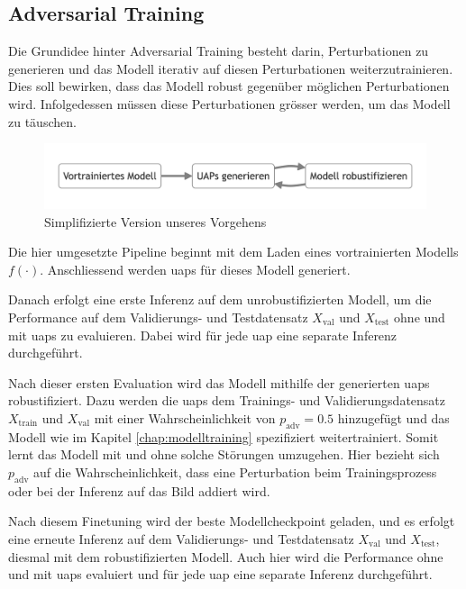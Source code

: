 \subsection{Adversarial Training} \label{chap:adversarial training}

Die Grundidee hinter Adversarial Training besteht darin, Perturbationen zu generieren und das Modell iterativ auf diesen Perturbationen weiterzutrainieren. Dies soll bewirken, dass das Modell robust gegenüber möglichen Perturbationen wird. Infolgedessen müssen diese Perturbationen grösser werden, um das Modell zu täuschen.

\begin{figure}[H]
    \centering
    \includegraphics[width=\linewidth]{01-images/04-methodik/simplified_overview.png}
    \caption{Simplifizierte Version unseres Vorgehens}
    \label{fig:07-simplified_overview}
\end{figure}

Die hier umgesetzte Pipeline beginnt mit dem Laden eines vortrainierten Modells $f(\cdot)$. Anschliessend werden \acrshort{uap}s für dieses Modell generiert. 

Danach erfolgt eine erste Inferenz auf dem unrobustifizierten Modell, um die Performance auf dem Validierungs- und  Testdatensatz $X_{\text{val}}$ und $X_{\text{test}}$ ohne und mit \acrshort{uap}s zu evaluieren. Dabei wird für jede \acrshort{uap} eine separate Inferenz durchgeführt. 

Nach dieser ersten Evaluation wird das Modell mithilfe der generierten \acrshort{uap}s robustifiziert. Dazu werden die \acrshort{uap}s dem Trainings- und Validierungsdatensatz $X_{\text{train}}$ und $X_{\text{val}}$ mit einer Wahrscheinlichkeit von $p_{\text{adv}} = 0.5$ hinzugefügt und das Modell wie im Kapitel \ref{chap:modelltraining} spezifiziert weitertrainiert. Somit lernt das Modell mit und ohne solche Störungen umzugehen. Hier bezieht sich $p_{\text{adv}}$ auf die Wahrscheinlichkeit, dass eine Perturbation beim Trainingsprozess oder bei der Inferenz auf das Bild addiert wird. 

Nach diesem Finetuning wird der beste Modellcheckpoint geladen, und es erfolgt eine erneute Inferenz auf dem Validierungs- und Testdatensatz $X_{\text{val}}$ und $X_{\text{test}}$, diesmal mit dem robustifizierten Modell. Auch hier wird die Performance ohne und mit \acrshort{uap}s evaluiert und für jede \acrshort{uap} eine separate Inferenz durchgeführt. 

